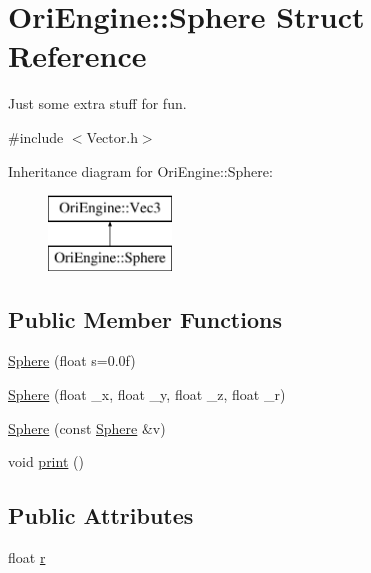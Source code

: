 \hypertarget{struct_ori_engine_1_1_sphere}{}\section{Ori\+Engine\+:\+:Sphere Struct Reference}
\label{struct_ori_engine_1_1_sphere}


Just some extra stuff for fun.  




{\ttfamily \#include $<$Vector.\+h$>$}

Inheritance diagram for Ori\+Engine\+:\+:Sphere\+:\begin{figure}[H]
\begin{center}
\leavevmode
\includegraphics[height=2.000000cm]{struct_ori_engine_1_1_sphere}
\end{center}
\end{figure}
\subsection*{Public Member Functions}
\begin{DoxyCompactItemize}
\item 
\hyperlink{struct_ori_engine_1_1_sphere_ac20aefe7563c0713c9ff1129887437fd}{Sphere} (float s=0.\+0f)
\item 
\hyperlink{struct_ori_engine_1_1_sphere_ad2abc0c7e4786dcf29394b30cbeca2dd}{Sphere} (float \+\_\+x, float \+\_\+y, float \+\_\+z, float \+\_\+r)
\item 
\hyperlink{struct_ori_engine_1_1_sphere_aaff2b5e8886e1a2e4b17b0e615c1f2e7}{Sphere} (const \hyperlink{struct_ori_engine_1_1_sphere}{Sphere} \&v)
\item 
void \hyperlink{struct_ori_engine_1_1_sphere_a35400ef1bae1de87d1ccc6dfe9b3b5be}{print} ()
\end{DoxyCompactItemize}
\subsection*{Public Attributes}
\begin{DoxyCompactItemize}
\item 
float \hyperlink{struct_ori_engine_1_1_sphere_a24c8eda50b041688fd57b2b3c1305726}{r}
\end{DoxyCompactItemize}


